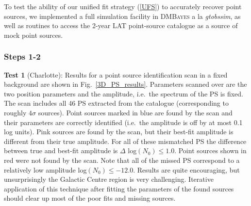 \documentclass{article}
\begin{document}
To test the ability of our unified fit strategy (\ref{UFS}) to accurately recover point sources, we implemented a full simulation facility in \textsc{DMBayes} a la \textit{gtobssim}, as well as routines to access the 2-year LAT point-source catalogue as a source of mock point sources.

\subsubsection*{Steps 1-2}

\textbf{Test 1} (Charlotte): Results for a point source identification scan in a fixed background are shown in Fig.~\ref{3D_PS_results}. Parameters scanned over are the two position parameters and the amplitude, i.e.\ the spectrum of the PS is fixed. The scan includes all 46 PS extracted from the catalogue (corresponding to roughly $4\sigma$ sources). Point sources marked in blue are found by the scan and their parameters are correctly identified (i.e.\ the amplitude is off by at most 0.1 log units). Pink sources are found by the scan, but their best-fit amplitude is different from their true amplitude. For all of these mismatched PS the difference between true and best-fit amplitude is $\Delta$ log$(N_0) \leq 1.0$. Point sources shown in red were not found by the scan. Note that all of the missed PS correspond to a relatively low amplitude log$(N_0) \leq -12.0$.  Results are quite encouraging, but unsurprisingly the Galactic Centre region is very challenging.  Iterative application of this technique after fitting the parameters of the found sources should clear up most of the poor fits and missing sources.
\end{document}
